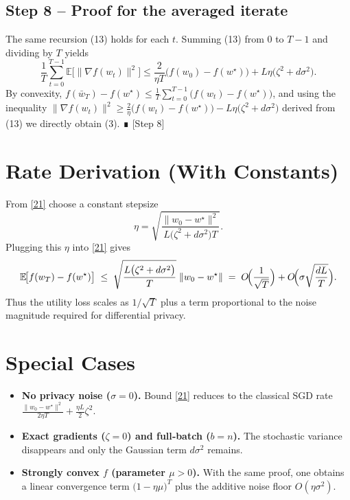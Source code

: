 \documentclass{article}
\newcommand{\E}{\mathbb{E}}
\begin{document}
\subsection*{Step 8 – Proof for the averaged iterate}
The same recursion (13) holds for each $t$.  Summing (13) from $0$ to $T-1$
and dividing by $T$ yields
\[
\frac{1}{T}\sum_{t=0}^{T-1}\E\!\bigl[\|\nabla f(w_t)\|^2\bigr]
\le \frac{2}{\eta T}\bigl(f(w_0)-f(w^\star)\bigr)
   +L\eta\bigl(\zeta^{2}+d\sigma^{2}\bigr).                       \tag{22}
\] 
By convexity,
$f(\bar w_T)-f(w^\star)\le \frac{1}{T}\sum_{t=0}^{T-1}\bigl(f(w_t)-f(w^\star)\bigr)$,
and using the inequality $\|\nabla f(w_t)\|^2\ge
\frac{2}{\eta}\bigl(f(w_t)-f(w^\star)\bigr)-L\eta\bigl(\zeta^{2}+d\sigma^{2}\bigr)$
derived from (13) we directly obtain (3).  ∎
[Step 8]

\section*{Rate Derivation (With Constants)}
From \eqref{21} choose a constant stepsize
\[
\eta = \sqrt{\frac{\|w_0-w^\star\|^{2}}
                 {L\bigl(\zeta^{2}+d\sigma^{2}\bigr)T}} .
\] 
Plugging this $\eta$ into \eqref{21} gives
\[
\E\!\bigl[f(w_T)-f(w^\star)\bigr]
\;\le\;
\sqrt{\frac{L\bigl(\zeta^{2}+d\sigma^{2}\bigr)}
           {T}}\;\|w_0-w^\star\|
\;=\;
O\!\Bigl(\frac{1}{\sqrt{T}}\Bigr)
   +O\!\Bigl(\sigma\sqrt{\frac{dL}{T}}\Bigr).
\] 
Thus the utility loss scales as $1/\sqrt{T}$ plus a term proportional to
the noise magnitude required for differential privacy.

\section*{Special Cases}
\begin{itemize}
\item \textbf{No privacy noise ($\sigma=0$).}  Bound \eqref{21}
reduces to the classical SGD rate
$\frac{\|w_0-w^\star\|^{2}}{2\eta T} + \frac{\eta L}{2}\zeta^{2}$.
\item \textbf{Exact gradients ($\zeta=0$) and full‑batch ($b=n$).}
  The stochastic variance disappears and only the Gaussian term $d\sigma^{2}$
  remains.
\item \textbf{Strongly convex $f$ (parameter $\mu>0$).}
  With the same proof, one obtains a linear convergence term
  $\bigl(1-\eta\mu\bigr)^{T}$ plus the additive noise floor
  $O(\eta\sigma^{2})$.
\end{itemize}
\end{document}
